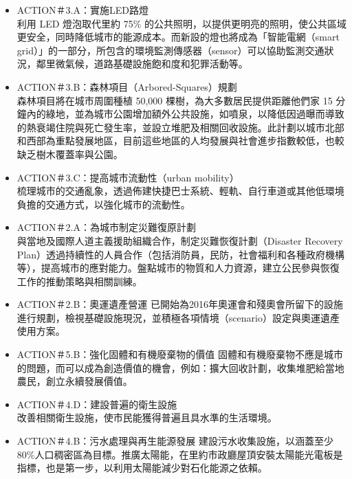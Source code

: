 \documentclass[a4paper,12pt]{article}
\begin{document}
\begin{enumerate}
\begin{enumerate}
\begin{itemize}
\item ACTION＃3.A：實施LED路燈\\
利用 LED 燈泡取代里約 75\% 的公共照明，以提供更明亮的照明，使公共區域更安全，同時降低城市的能源成本。而新設的燈也將成為「智能電網（smart grid）」的一部分，所包含的環境監測傳感器（sensor）可以協助監測交通狀況，鄰里微氣候，道路基礎設施飽和度和犯罪活動等。\\
\item ACTION＃3.B：森林項目（Arbored-Squares）規劃\\
森林項目將在城市周圍種植 50,000 棵樹，為大多數居民提供距離他們家 15 分鐘內的綠地，並為城市公園增加額外公共設施，如噴泉，以降低因過曝而導致的熱衰竭住院與死亡發生率，並設立堆肥及相關回收設施。此計劃以城市北部和西部為重點發展地區，目前這些地區的人均發展與社會進步指數較低，也較缺乏樹木覆蓋率與公園。\\
\item ACTION＃3.C：提高城市流動性（urban mobility）\\
梳理城市的交通亂象，透過佈建快捷巴士系統、輕軌、自行車道或其他低環境負擔的交通方式，以強化城市的流動性。\\
\item ACTION＃2.A：為城市制定災難復原計劃\\
與當地及國際人道主義援助組織合作，制定災難恢復計劃（Disaster Recovery Plan）透過持續性的人員合作（包括消防員，民防，社會福利和各種政府機構等），提高城市的應對能力。盤點城市的物質和人力資源，建立公民參與恢復工作的推動策略與相關訓練。\\
\item ACTION＃2.B：奧運遺產營運  已開始為2016年奧運會和殘奧會所留下的設施進行規劃，檢視基礎設施現況，並積極各項情境（scenario）設定與奧運遺產使用方案。\\
\item ACTION＃5.B：強化固體和有機廢棄物的價值  固體和有機廢棄物不應是城市的問題，而可以成為創造價值的機會，例如：擴大回收計劃，收集堆肥給當地農民，創立永續發展價值。\\
\item ACTION＃4.D：建設普遍的衛生設施\\
改善相關衛生設施，使市民能獲得普遍且具水準的生活環境。\\
\item ACTION＃4.B：污水處理與再生能源發展  建設污水收集設施，以涵蓋至少80\%人口稠密區為目標。推廣太陽能，在里約市政廳屋頂安裝太陽能光電板是指標，也是第一步，以利用太陽能減少對石化能源之依賴。\\
\end{itemize}

\end{enumerate}
\end{enumerate}
\end{document}
